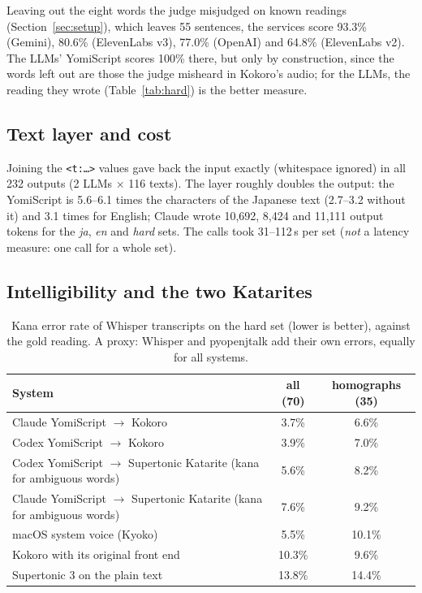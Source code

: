 \documentclass[11pt,a4paper]{article}
\newcommand{\ys}[1]{\mbox{\texttt{#1}}}
\begin{document}
Leaving out the eight words the judge misjudged on known readings (Section~\ref{sec:setup}), which leaves 55 sentences,
the services score 93.3\% (Gemini), 80.6\% (ElevenLabs v3), 77.0\% (OpenAI) and 64.8\% (ElevenLabs v2). The LLMs'
YomiScript scores 100\% there, but only by construction, since the words left out are those the judge misheard in
Kokoro's audio; for the LLMs, the reading they wrote (Table~\ref{tab:hard}) is the better measure.

\subsection{Text layer and cost}

Joining the \ys{<t:…>} values gave back the input exactly (whitespace ignored) in all 232 outputs (2 LLMs $\times$ 116
texts). The layer roughly doubles the output: the YomiScript is 5.6--6.1 times the characters of the Japanese text
(2.7--3.2 without it) and 3.1 times for English; Claude wrote 10{,}692, 8{,}424 and 11{,}111 output tokens for the
\emph{ja}, \emph{en} and \emph{hard} sets. The calls took 31--112\,s per set (\emph{not} a latency measure: one call
for a whole set).

\subsection{Intelligibility and the two Katarites}

\begin{table}[t]
\centering\small
\caption{Kana error rate of Whisper transcripts on the hard set (lower is better), against the gold reading. A proxy:
Whisper and pyopenjtalk add their own errors, equally for all systems.}
\label{tab:asr}
\begin{tabular}{lcc}
\toprule
System & all (70) & homographs (35)\\
\midrule
Claude YomiScript $\to$ Kokoro & 3.7\% & 6.6\%\\
Codex YomiScript $\to$ Kokoro & 3.9\% & 7.0\%\\
Codex YomiScript $\to$ Supertonic Katarite (kana for ambiguous words) & 5.6\% & 8.2\%\\
Claude YomiScript $\to$ Supertonic Katarite (kana for ambiguous words) & 7.6\% & 9.2\%\\
macOS system voice (Kyoko) & 5.5\% & 10.1\%\\
Kokoro with its original front end & 10.3\% & 9.6\%\\
Supertonic 3 on the plain text & 13.8\% & 14.4\%\\
\bottomrule
\end{tabular}
\end{table}
\end{document}
